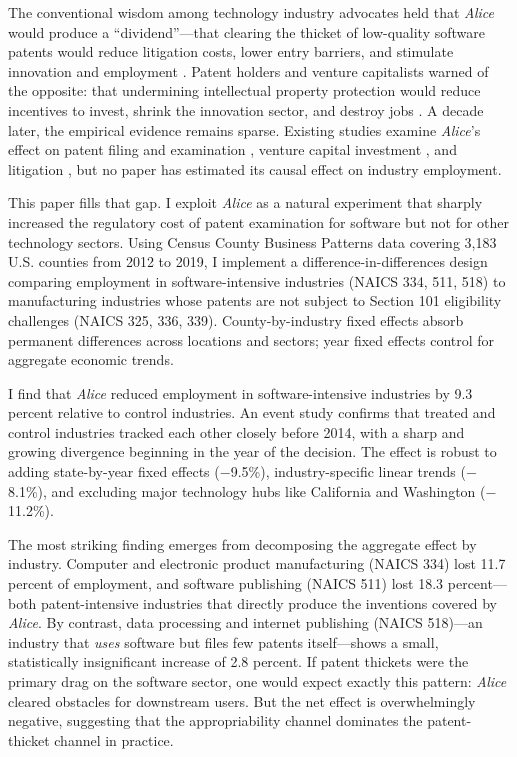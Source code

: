 \documentclass[12pt]{article}
\begin{document}
The conventional wisdom among technology industry advocates held that \textit{Alice} would produce a ``dividend''---that clearing the thicket of low-quality software patents would reduce litigation costs, lower entry barriers, and stimulate innovation and employment \citep{bessen2008patent, lemley2012software}. Patent holders and venture capitalists warned of the opposite: that undermining intellectual property protection would reduce incentives to invest, shrink the innovation sector, and destroy jobs \citep{mann2005patent, graham2009high}. A decade later, the empirical evidence remains sparse. Existing studies examine \textit{Alice}'s effect on patent filing and examination \citep{lemley2021alice}, venture capital investment \citep{farre2020lost}, and litigation \citep{allison2017understanding}, but no paper has estimated its causal effect on industry employment.

This paper fills that gap. I exploit \textit{Alice} as a natural experiment that sharply increased the regulatory cost of patent examination for software but not for other technology sectors. Using Census County Business Patterns data covering 3,183 U.S. counties from 2012 to 2019, I implement a difference-in-differences design comparing employment in software-intensive industries (NAICS 334, 511, 518) to manufacturing industries whose patents are not subject to Section 101 eligibility challenges (NAICS 325, 336, 339). County-by-industry fixed effects absorb permanent differences across locations and sectors; year fixed effects control for aggregate economic trends.

I find that \textit{Alice} reduced employment in software-intensive industries by 9.3 percent relative to control industries. An event study confirms that treated and control industries tracked each other closely before 2014, with a sharp and growing divergence beginning in the year of the decision. The effect is robust to adding state-by-year fixed effects ($-$9.5\%), industry-specific linear trends ($-$8.1\%), and excluding major technology hubs like California and Washington ($-$11.2\%).

The most striking finding emerges from decomposing the aggregate effect by industry. Computer and electronic product manufacturing (NAICS 334) lost 11.7 percent of employment, and software publishing (NAICS 511) lost 18.3 percent---both patent-intensive industries that directly produce the inventions covered by \textit{Alice}. By contrast, data processing and internet publishing (NAICS 518)---an industry that \emph{uses} software but files few patents itself---shows a small, statistically insignificant increase of 2.8 percent. If patent thickets were the primary drag on the software sector, one would expect exactly this pattern: \textit{Alice} cleared obstacles for downstream users. But the net effect is overwhelmingly negative, suggesting that the appropriability channel dominates the patent-thicket channel in practice.
\end{document}
